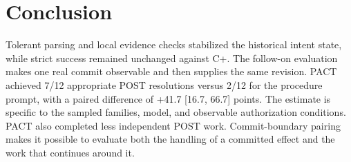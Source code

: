 \section{Conclusion}

Tolerant parsing and local evidence checks stabilized the historical intent state, while strict success remained unchanged against C+. The follow-on evaluation makes one real commit observable and then supplies the same revision. PACT achieved 7/12 appropriate POST resolutions versus 2/12 for the procedure prompt, with a paired difference of +41.7 [16.7, 66.7] points. The estimate is specific to the sampled families, model, and observable authorization conditions. PACT also completed less independent POST work. Commit-boundary pairing makes it possible to evaluate both the handling of a committed effect and the work that continues around it.
